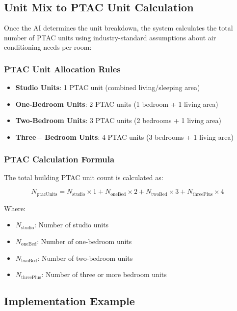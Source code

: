 \documentclass{article}
\begin{document}
\subsection{Unit Mix to PTAC Unit Calculation}

Once the AI determines the unit breakdown, the system calculates the total number of PTAC units using industry-standard assumptions about air conditioning needs per room:

\subsubsection{PTAC Unit Allocation Rules}

\begin{itemize}
    \item \textbf{Studio Units}: 1 PTAC unit (combined living/sleeping area)
    \item \textbf{One-Bedroom Units}: 2 PTAC units (1 bedroom + 1 living area)
    \item \textbf{Two-Bedroom Units}: 3 PTAC units (2 bedrooms + 1 living area)
    \item \textbf{Three+ Bedroom Units}: 4 PTAC units (3 bedrooms + 1 living area)
\end{itemize}

\subsubsection{PTAC Calculation Formula}

The total building PTAC unit count is calculated as:

\begin{equation}
N_{\text{ptacUnits}} = N_{\text{studio}} \times 1 + N_{\text{oneBed}} \times 2 + N_{\text{twoBed}} \times 3 + N_{\text{threePlus}} \times 4
\end{equation}

Where:
\begin{itemize}
    \item $N_{\text{studio}}$: Number of studio units
    \item $N_{\text{oneBed}}$: Number of one-bedroom units  
    \item $N_{\text{twoBed}}$: Number of two-bedroom units
    \item $N_{\text{threePlus}}$: Number of three or more bedroom units
\end{itemize}

\subsection{Implementation Example}
\end{document}
